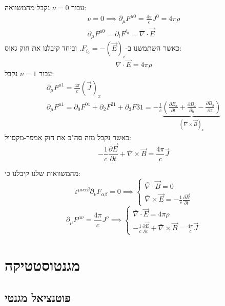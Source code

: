 \documentclass{tstextbook}
\begin{document}
עבור \(\nu=0\) נקבל מהמשוואה:
\begin{gather*}\nu=0\implies \partial_{\mu} F^{\mu 0}= \frac{4\pi}{c}J^0=4\pi \rho  \\\partial_{\mu}F^{\mu 0}=\partial_{i} F^{i_{0}}= \bar{\nabla} \cdot \vec{E}
\end{gather*}
כאשר השתמשנו ב-\(F_{i_{0}}=-\left( \vec{E} \right)_{i}\). וביחד קיבלנו את חוק גאוס:
$$\bar{\nabla} \cdot \vec{E}=4\pi \rho$$
עבור \(\nu=1\) נקבל:
\begin{gather*}\partial_{\mu}F^{\mu 1}=\frac{4\pi}{c}\left( \vec{J} \right)_{x}  \\\partial_{\mu} F^{\mu 1} = \partial_{0} F^{01}+\partial_{2} F^{21}+\partial_{3}F{31}=-\frac{1}{c}\underbrace{ \left( \frac{\partial E_{x}}{\partial t} +\frac{\partial B_{z}}{\partial y} -\frac{\partial B_{y}}{\partial z}  \right) }_{ \left( \bar{\nabla} \times \vec{B} \right)_{x} }
\end{gather*}
כאשר נקבל מזה סה"כ את חוק אמפר-מקסוול:
$$-\frac{1}{c}\frac{\partial \vec{E}}{\partial t} + \bar{\nabla} \times \vec{B} = \frac{4\pi}{c}\vec{J}$$

\begin{corollary}
מהמשוואות שלנו קיבלנו כי:
$$\varepsilon^{\mu \nu \alpha \beta}\partial_{\nu}F_{\alpha \beta}=0\implies \begin{cases}\bar{\nabla} \cdot \vec{B} = 0 \\\bar{\nabla} \times \vec{E} = -\frac{1}{c} \frac{\partial \vec{B}}{\partial t} 
\end{cases}$$$$\partial_{\mu}F^{\mu \nu}=\frac{4\pi}{c}J^{\nu}\implies\begin{cases} \bar{\nabla} \cdot \vec{E}=4\pi \rho \\-\frac{1}{c}\frac{\partial \vec{E}}{\partial t} + \bar{\nabla} \times \vec{B} = \frac{4\pi}{c}\vec{J} 
\end{cases}$$

\end{corollary}
\chapter{מגנטוסטטיקה}

\section{פוטנציאל מגנטי}
\end{document}
